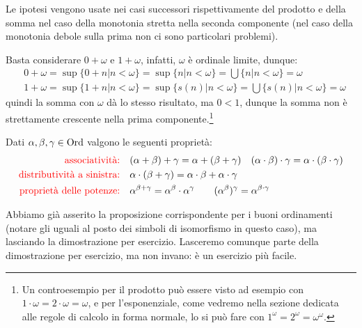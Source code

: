 \begin{soln}
	Le ipotesi vengono usate nei casi successori rispettivamente del prodotto e della somma nel caso della monotonia stretta nella seconda componente (nel caso della monotonia debole sulla prima non ci sono particolari problemi).
\end{soln}

\begin{remark}
	Basta considerare $0 + \omega$ e $1 + \omega$, infatti, $\omega$ è ordinale limite, dunque:
	\begin{align*}
		& 0 + \omega = \sup \{0 + n | n < \omega\} = \sup \{n | n < \omega\} = \bigcup \{n | n < \omega\} = \omega \\
		& 1 + \omega = \sup \{1 + n | n < \omega\} = \sup \{s(n) | n < \omega\} = \bigcup \{s(n) | n < \omega\} = \omega
	\end{align*}
	quindi la somma con $\omega$ dà lo stesso risultato, ma $0 < 1$, dunque la somma non è strettamente crescente nella prima componente.\footnote{Un controesempio per il prodotto può essere visto ad esempio con $1 \cdot \omega = 2 \cdot \omega = \omega$, e per l'esponenziale,
	come vedremo nella sezione dedicata alle regole di calcolo in forma normale, lo si può fare con $1^\omega = 2^\omega = \omega^\omega$.}
\end{remark}

\begin{proposition}
	Dati $\alpha,\beta,\gamma \in \operatorname{Ord}$ valgono le seguenti proprietà:
	\[\begin{split}
		\text{\textcolor{red}{associatività:}} &\quad (\alpha + \beta) + \gamma = \alpha + (\beta + \gamma) \quad (\alpha \cdot \beta) \cdot \gamma = \alpha \cdot (\beta \cdot \gamma)\\
		\text{\textcolor{red}{distributività a sinistra:}} &\quad  \alpha \cdot (\beta + \gamma) = \alpha \cdot \beta + \alpha \cdot \gamma \\
		\text{\textcolor{red}{proprietà delle potenze:}} &\quad {\alpha}^{\beta + \gamma} = \alpha^{\beta} \cdot \alpha^{\gamma} \qquad ({\alpha}^{\beta})^{\gamma} = {\alpha}^{\beta \cdot \gamma}
	\end{split}\]
\end{proposition}

\begin{note}
	Abbiamo già asserito la proposizione corrispondente per i buoni ordinamenti (notare gli uguali al posto dei simboli di isomorfismo in questo caso), ma lasciando la dimostrazione per esercizio.
	Lasceremo comunque parte della dimostrazione per esercizio, ma non invano: è un esercizio più facile.
\end{note}

